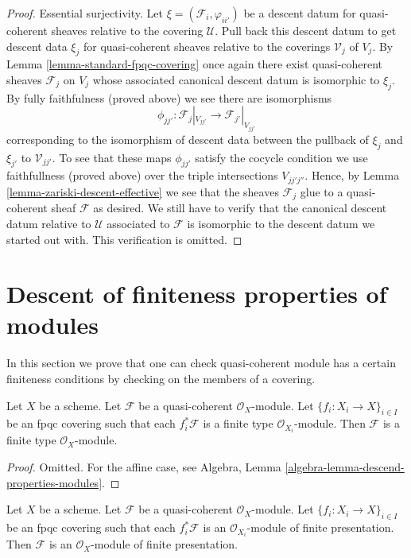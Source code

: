 \begin{proof}
\medskip\noindent
Essential surjectivity. Let $\xi = (\mathcal{F}_i, \varphi_{ii'})$
be a descent datum for quasi-coherent sheaves relative to the covering
$\mathcal{U}$. Pull back this descent datum to get descent data
$\xi_j$ for quasi-coherent sheaves relative to the coverings
$\mathcal{V}_j$ of $V_j$. By Lemma \ref{lemma-standard-fpqc-covering}
once again there exist
quasi-coherent sheaves $\mathcal{F}_j$ on $V_j$ whose associated
canonical descent datum is isomorphic to $\xi_j$. By fully faithfulness
(proved above) we see there are isomorphisms
$$
\phi_{jj'} :
\mathcal{F}_j|_{V_{jj'}}
\longrightarrow
\mathcal{F}_{j'}|_{V_{jj'}}
$$
corresponding to the isomorphism of descent data between the pullback
of $\xi_j$ and $\xi_{j'}$ to $\mathcal{V}_{jj'}$. To see that these
maps $\phi_{jj'}$ satisfy the cocycle condition we use faithfullness
(proved above) over the triple intersections $V_{jj'j''}$. Hence, by
Lemma \ref{lemma-zariski-descent-effective}
we see that the sheaves $\mathcal{F}_j$
glue to a quasi-coherent sheaf $\mathcal{F}$ as desired.
We still have to verify that the canonical descent datum relative to
$\mathcal{U}$ associated to $\mathcal{F}$ is isomorphic to the descent
datum we started out with. This verification is omitted.
\end{proof}


\section{Descent of finiteness properties of modules}
\label{section-descent-finiteness}

\noindent
In this section we prove that one can check quasi-coherent module
has a certain finiteness conditions by checking on the members of
a covering.

\begin{lemma}
\label{lemma-finite-type-descends}
Let $X$ be a scheme.
Let $\mathcal{F}$ be a quasi-coherent $\mathcal{O}_X$-module.
Let $\{f_i : X_i \to X\}_{i \in I}$ be an fpqc covering such that
each $f_i^*\mathcal{F}$ is a finite type $\mathcal{O}_{X_i}$-module.
Then $\mathcal{F}$ is a finite type $\mathcal{O}_X$-module.
\end{lemma}

\begin{proof}
Omitted. For the affine case, see
Algebra, Lemma \ref{algebra-lemma-descend-properties-modules}.
\end{proof}

\begin{lemma}
\label{lemma-finite-presentation-descends}
Let $X$ be a scheme.
Let $\mathcal{F}$ be a quasi-coherent $\mathcal{O}_X$-module.
Let $\{f_i : X_i \to X\}_{i \in I}$ be an fpqc covering such that
each $f_i^*\mathcal{F}$ is an $\mathcal{O}_{X_i}$-module of finite
presentation. Then $\mathcal{F}$ is an $\mathcal{O}_X$-module
of finite presentation.
\end{lemma}

